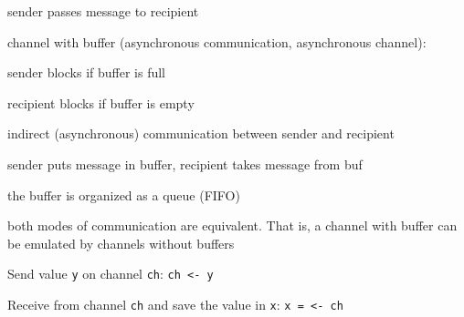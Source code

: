 \documentclass[landscape, a4paper]{article}
\begin{document}
\begin{minipage}[t]{0.2\linewidth}
\begin{betterlist}
\begin{betterlist}
\begin{betterlist}
\begin{betterlist}
					\item sender passes message to recipient
				\end{betterlist}
				\item channel with buffer (asynchronous communication, asynchronous channel):
				\begin{betterlist}
					\item sender blocks if buffer is full
					\item recipient blocks if buffer is empty
					\item indirect (asynchronous) communication between sender and recipient
					\item sender puts message in buffer, recipient takes message from buf
					\item the buffer is organized as a queue (FIFO)
				\end{betterlist}
			\end{betterlist}
			\item both modes of communication are equivalent. That is, a channel with buffer can be emulated by channels without buffers
			\item \alert{Send value \texttt{y} on channel \texttt{ch}:} \verb|ch <- y|
			\item \alert{Receive from channel \texttt{ch} and save the value in \texttt{x}:} \verb|x = <- ch|

\end{betterlist}
\end{betterlist}
\end{minipage}
\end{document}

